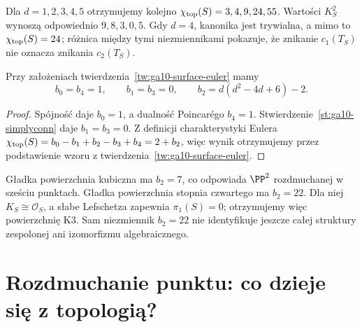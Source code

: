 \begin{przyklad}
Dla $d=1,2,3,4,5$ otrzymujemy kolejno
$\chi_{\rm top}(S)=3,4,9,24,55$.
Wartości $K_S^2$ wynoszą odpowiednio $9,8,3,0,5$.
Gdy $d=4$, kanonika jest trywialna, a mimo to
$\chi_{\rm top}(S)=24$; różnica między tymi niezmiennikami
pokazuje, że znikanie $c_1(T_S)$ nie oznacza znikania
$c_2(T_S)$.
\end{przyklad}

\begin{stwierdzenie}
\label{st:ga10-betti}
Przy założeniach twierdzenia~\ref{tw:ga10-surface-euler} mamy
\[
 b_0=b_4=1,\qquad b_1=b_3=0,\qquad
 b_2=d(d^2-4d+6)-2.
\]
\end{stwierdzenie}
\begin{proof}
Spójność daje $b_0=1$, a dualność Poincarégo $b_4=1$.
Stwierdzenie~\ref{st:ga10-simplyconn} daje $b_1=b_3=0$.
Z definicji charakterystyki Eulera
$\chi_{\rm top}(S)=b_0-b_1+b_2-b_3+b_4=2+b_2$,
więc wynik otrzymujemy przez podstawienie
wzoru z twierdzenia~\ref{tw:ga10-surface-euler}.
\end{proof}

\begin{przyklad}
Gładka powierzchnia kubiczna ma $b_2=7$,
co odpowiada $\PP^2$ rozdmuchanej w sześciu punktach.
Gładka powierzchnia stopnia czwartego ma $b_2=22$.
Dla niej $K_S\cong\mathcal O_S$, a słabe Lefschetza
zapewnia $\pi_1(S)=0$; otrzymujemy więc powierzchnię K3.
Sam niezmiennik $b_2=22$ nie identyfikuje jeszcze całej
struktury zespolonej ani izomorfizmu algebraicznego.
\end{przyklad}

\section{Rozdmuchanie punktu: co dzieje się z topologią?}
\label{sec:ga10-blowup}

